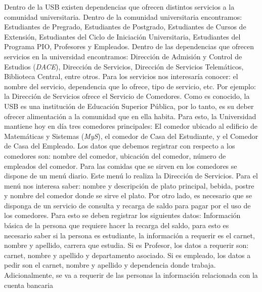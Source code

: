 \documentclass[12pt,a4paper,spanish]{article}
\begin{document}
\indent Dentro de la USB existen dependencias que ofrecen distintos
servicios a la comunidad universitaria. Dentro de la comunidad
universitaria encontramos: Estudiantes de Pregrado, Estudiantes de
Postgrado, Estudiantes de Cursos de Extensi\'on, Estudiantes del Ciclo
de Iniciaci\'on Universitaria, Estudiantes del Programa PIO,
Profesores y Empleados. Dentro de las dependencias que ofrecen
servicios en la universidad encontramos: Direcci\'on de Admisi\'on y
Control de Estudios (\emph{DACE}), Direcci\'on de Servicios,
Direcci\'on de Servicios Telem\'aticos, Biblioteca Central, entre
otros. 
\newline
\newline
\indent Para los servicios nos interesar\'ia conocer: el nombre del
servicio, dependencia que lo ofrece, tipo de servicio, etc. Por
ejemplo: la Direcci\'on de Servicios ofrece el Servicio de
Comedores. Como es conocido, la USB es una instituci\'on de
Educaci\'on Superior P\'ublica, por lo tanto, es su deber ofrecer
alimentaci\'on a la comunidad que en ella habita. Para esto, la
Universidad mantiene hoy en d\'ia tres comedores principales: El
comedor ubicado al edificio de Matem\'aticas y Sistemas (\emph{MyS}),
el comedor de Casa del Estudiante, y el Comedor de Casa del
Empleado. 
\newline
\newline
\indent Los datos que debemos registrar con respecto a los comedores son: nombre del
comedor, ubicaci\'on del comedor, n\'umero de empleados del
comedor. Para las comidas que se sirven en los comedores se dispone de
un men\'u diario. Este men\'u lo realiza la Direcci\'on de
Servicios. Para el men\'u nos interesa saber: nombre y descripci\'on de plato principal, bebida,
postre y nombre del comedor donde se sirve el plato. 
\newline
\newline
\indent Por otro lado, es necesario que se disponga de un servicio de consulta y recarga de saldo para
pagar por el uso de los comedores. Para esto se deben
registrar los siguientes datos: Informaci\'on b\'asica de la persona
que requiere hacer la recarga del saldo, para esto es necesario
saber si la persona es estudiante, la informaci\'on a requerir es el
carnet, nombre y apellido, carrera que estudia. Si es Profesor, los
datos a requerir son: carnet, nombre y apellido y departamento
asociado. Si es empleado, los datos a pedir son el carnet, nombre y
apellido y dependencia donde trabaja. Adicionalmente, se va a requerir
de las personas la informaci\'on relacionada con la cuenta bancaria
\end{document}
